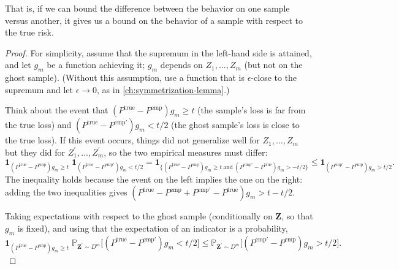 \begin{notechapter}
That is, if we can bound the difference between the behavior on one sample versus another, it gives us a bound on the behavior of a sample with respect to the true risk.

\begin{proof}
For simplicity, assume that the supremum in the left-hand side is attained, and let \(g_{m}\) be a function achieving it; \(g_m\) depends on \(Z_{1},\dots,Z_{m}\) (but not on the ghost sample). (Without this assumption, use a function that is \(\epsilon\)-close to the supremum and let \(\epsilon \to 0\), as in \cref{ch:symmetrization-lemma}.)

Think about the event that \((P^{\text{true}}-P^{\text{emp}})g_{m}\geq t\) (the sample's loss is far from the true loss) and \((P^{\text{true}}-P^{\text{emp}'})g_{m}<t/2\) (the ghost sample's loss is close to the true loss). If this event occurs, things did not generalize well for \(Z_{1},\dots,Z_{m}\) but they did for \(Z_{1}^{\prime},\dots,Z_{m}^{\prime}\), so the two empirical measures must differ:
\[
\mathbf{1}_{(P^{\text{true}}-P^{\text{emp}})g_{m}\geq t}\;\mathbf{1}_{(P^{\text{true}}-P^{\text{emp}'})g_{m}<t/2}
= \mathbf{1}_{\{(P^{\text{true}}-P^{\text{emp}})g_{m}\geq t\ \text{and}\ (P^{\text{emp}'}-P^{\text{true}})g_{m}>-t/2\}}
\leq \mathbf{1}_{(P^{\text{emp}'}-P^{\text{emp}})g_{m}>t/2}.
\]
The inequality holds because the event on the left implies the one on the right: adding the two inequalities gives \((P^{\text{true}}-P^{\text{emp}}+P^{\text{emp}'}-P^{\text{true}})g_{m}>t-t/2\).

Taking expectations with respect to the ghost sample (conditionally on \(\mathbf{Z}\), so that \(g_m\) is fixed), and using that the expectation of an indicator is a probability,
\begin{equation}\label{empirical-risk-minimization:eq:p_rem}
\mathbf{1}_{(P^{\text{true}}-P^{\text{emp}})g_{m}\geq t}\;\mathbb{P}_{\mathbf{Z}^{\prime}\sim D^{m}}\big[(P^{\text{true}}-P^{\text{emp}'})g_{m}<t/2\big]
\leq \mathbb{P}_{\mathbf{Z}^{\prime}\sim D^{m}}\big[(P^{\text{emp}'}-P^{\text{emp}})g_{m}>t/2\big].
\end{equation}


\end{proof}
\end{notechapter}

